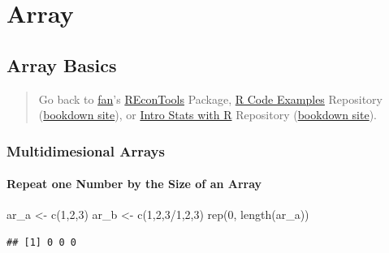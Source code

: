 \documentclass[
]{book}
\newenvironment{Shaded}{\begin{snugshade}}{\end{snugshade}}
\newcommand{\DecValTok}[1]{\textcolor[rgb]{0.00,0.00,0.81}{#1}}
\newcommand{\FunctionTok}[1]{\textcolor[rgb]{0.00,0.00,0.00}{#1}}
\newcommand{\NormalTok}[1]{#1}
\newcommand{\OtherTok}[1]{\textcolor[rgb]{0.56,0.35,0.01}{#1}}
\newcommand{\SpecialCharTok}[1]{\textcolor[rgb]{0.00,0.00,0.00}{#1}}
\begin{document}
\hypertarget{array}{%
\section{Array}\label{array}}

\hypertarget{array-basics}{%
\subsection{Array Basics}\label{array-basics}}

\begin{quote}
Go back to \href{http://fanwangecon.github.io/}{fan}'s \href{https://fanwangecon.github.io/REconTools/}{REconTools} Package, \href{https://fanwangecon.github.io/R4Econ/}{R Code Examples} Repository (\href{https://fanwangecon.github.io/R4Econ/bookdown}{bookdown site}), or \href{https://fanwangecon.github.io/Stat4Econ/}{Intro Stats with R} Repository (\href{https://fanwangecon.github.io/Stat4Econ/bookdown}{bookdown site}).
\end{quote}

\hypertarget{multidimesional-arrays}{%
\subsubsection{Multidimesional Arrays}\label{multidimesional-arrays}}

\hypertarget{repeat-one-number-by-the-size-of-an-array}{%
\paragraph{Repeat one Number by the Size of an Array}\label{repeat-one-number-by-the-size-of-an-array}}

\begin{Shaded}
\begin{Highlighting}[]
\NormalTok{ar\_a }\OtherTok{\textless{}{-}} \FunctionTok{c}\NormalTok{(}\DecValTok{1}\NormalTok{,}\DecValTok{2}\NormalTok{,}\DecValTok{3}\NormalTok{)}
\NormalTok{ar\_b }\OtherTok{\textless{}{-}} \FunctionTok{c}\NormalTok{(}\DecValTok{1}\NormalTok{,}\DecValTok{2}\NormalTok{,}\DecValTok{3}\SpecialCharTok{/}\DecValTok{1}\NormalTok{,}\DecValTok{2}\NormalTok{,}\DecValTok{3}\NormalTok{)}
\FunctionTok{rep}\NormalTok{(}\DecValTok{0}\NormalTok{, }\FunctionTok{length}\NormalTok{(ar\_a))}
\end{Highlighting}
\end{Shaded}

\begin{verbatim}
## [1] 0 0 0
\end{verbatim}
\end{document}
